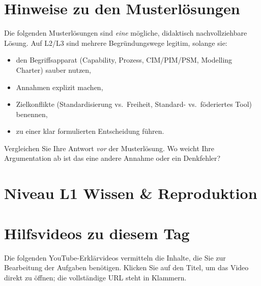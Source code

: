 \documentclass[11pt,a4paper,oneside]{article}
\begin{document}
\section*{Hinweise zu den Musterl\"osungen}
\thispagestyle{plain}

\noindent Die folgenden Musterl\"osungen sind \emph{eine} m\"ogliche, didaktisch nachvollziehbare L\"osung. Auf L2/L3 sind mehrere Begr\"undungswege legitim, solange sie:

\begin{itemize}
  \item den Begriffsapparat (Capability, Prozess, CIM/PIM/PSM, Modelling Charter) sauber nutzen,
  \item Annahmen explizit machen,
  \item Zielkonflikte (Standardisierung vs.\ Freiheit, Standard- vs.\ f\"oderiertes Tool) benennen,
  \item zu einer klar formulierten Entscheidung f\"uhren.
\end{itemize}

\begin{infobox}
Vergleichen Sie Ihre Antwort \emph{vor} der Musterl\"osung. Wo weicht Ihre Argumentation ab \textendash{} ist das eine andere Annahme oder ein Denkfehler?
\end{infobox}

\clearpage

\section*{Niveau L1 \textendash{} Wissen \& Reproduktion}

\section*{Hilfsvideos zu diesem Tag}
\thispagestyle{plain}

\noindent Die folgenden YouTube-Erkl\"arvideos vermitteln die Inhalte, die Sie zur Bearbeitung der Aufgaben ben\"otigen. Klicken Sie auf den Titel, um das Video direkt zu \"offnen; die vollst\"andige URL steht in Klammern.
\end{document}

